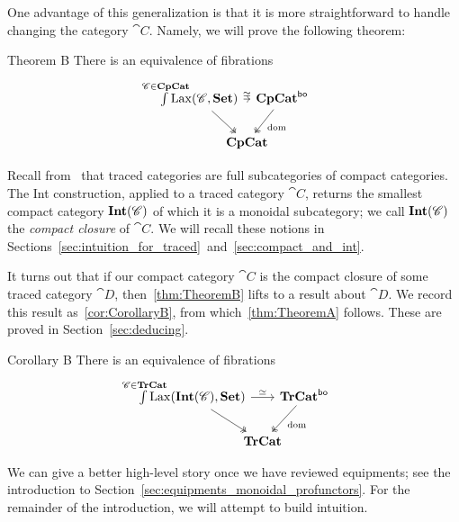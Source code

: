 \documentclass[12pt,oneside,article,draft]{memoir}
\begin{document}
One advantage of this generalization is that it is more straightforward to handle changing the
category $\cat{C}$. Namely, we will prove the following theorem:

\begin{named}{Theorem B}\label{thm:TheoremB}
   There is an equivalence of fibrations
   \begin{equation*}
      \begin{tikzcd}[column sep=-1.8em]
         \int\limits^{\mathclap{\cat{C}\in\CompCat}} \Lax(\cat{C},\Set)
               \ar[rr,"\equiv"] \ar[dr,two heads]
            && \CompCat^{\bo} \ar[dl,two heads,"\dom"] \\
         & \CompCat &
      \end{tikzcd}
   \end{equation*}
\end{named}
Recall from~\cite{JoyalStreetVerity} that traced categories are full subcategories of compact
categories.  The Int construction, applied to a traced category $\cat{C}$, returns the smallest
compact category $\mathbf{Int}(\mathscr{C})$ of which it is a monoidal subcategory; we call $\mathbf{Int}(\mathscr{C})$ the
\emph{compact closure} of $\cat{C}$. We will recall these notions in Sections~\ref{sec:intuition_for_traced}~and~\ref{sec:compact_and_int}.

It turns out that if our compact category $\cat{C}$ is the compact closure of some traced category
$\cat{D}$, then~\ref{thm:TheoremB} lifts to a result about $\cat{D}$. We record this result
as~\ref{cor:CorollaryB}, from which~\ref{thm:TheoremA} follows. These are proved in
Section~\ref{sec:deducing}.

\begin{named}{Corollary B}\label{cor:CorollaryB}
   There is an equivalence of fibrations
   \begin{equation*}
      \begin{tikzcd}[column sep=-1em]
         \int\limits^{\mathclap{\cat{C}\in\TrCat}} \Lax(\Int(\cat{C}),\Set)
               \ar[rr,"\equiv"] \ar[dr,two heads]
            && \TrCat^{\bo} \ar[dl,two heads,"\dom"] \\
         & \TrCat &
      \end{tikzcd}
   \end{equation*}
\end{named}

We can give a better high-level story once we have reviewed equipments; see the introduction to Section~\ref{sec:equipments_monoidal_profunctors}. For the remainder of the introduction, we will attempt to build intuition.
\end{document}
